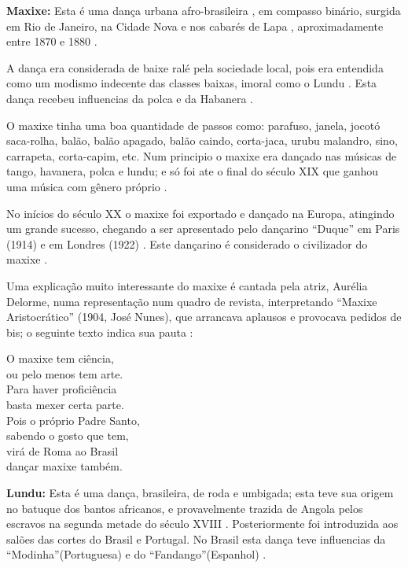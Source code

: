 \begin{remarcar}\textbf{Maxixe:}
Esta é uma dança urbana afro-brasileira \cite[pp. 4]{musicasambavariasdef1}, 
em compasso binário, surgida em Rio de Janeiro, 
na Cidade Nova e nos cabarés de Lapa \cite[pp. 465]{marcondes1977enciclopedia}  \cite[pp. 198]{dourado2004dicionario}, 
aproximadamente entre 1870 e 1880 \cite[pp. 465]{marcondes1977enciclopedia}  \cite[pp. 62]{reinato2010musica}.

A dança era considerada de baixe ralé pela sociedade local, 
pois era entendida como um modismo indecente das classes baixas, imoral como o Lundu \cite[pp. 198]{dourado2004dicionario}.
Esta dança recebeu influencias da polca \cite[pp. 198]{dourado2004dicionario} e da Habanera \cite[pp. 62]{reinato2010musica}.

O maxixe tinha uma boa quantidade de passos como: 
parafuso, 
janela,
jocotó
saca-rolha, 
balão, 
balão apagado,
balão caindo,
corta-jaca,
urubu malandro,
sino, 
carrapeta, 
corta-capim, 
\cite[pp. 465]{marcondes1977enciclopedia} \cite[pp. 68, 129, 131,173]{efege1974maxixe} etc. 
Num principio o maxixe era dançado nas músicas de tango, havanera, polca e lundu; 
e só foi ate o final do século XIX que ganhou uma música com gênero próprio \cite[pp. 465]{marcondes1977enciclopedia}.

No inícios do século XX o maxixe foi exportado e dançado na Europa, atingindo um grande sucesso, 
chegando a ser apresentado pelo dançarino ``Duque'' em Paris (1914) e em Londres (1922) \cite[pp. 465]{marcondes1977enciclopedia}.
Este dançarino é considerado o civilizador do maxixe \cite[pp. 129]{efege1974maxixe}.

Uma explicação muito interessante do maxixe é cantada pela atriz, Aurélia Delorme,
numa representação num quadro de revista, interpretando  ``Maxixe Aristocrático'' (1904, José Nunes), 
que arrancava aplausos e provocava pedidos de bis;
o seguinte texto indica sua pauta \cite[pp. 80-81]{efege1974maxixe} \cite{REIS2003}: 
\begin{citando}
O maxixe tem ciência,\\
ou pelo menos tem arte.\\
Para haver proficiência\\
basta mexer certa parte.\\
Pois o próprio Padre Santo,\\
sabendo o gosto que tem,\\
virá de Roma ao Brasil\\
dançar maxixe também.\\ 
\end{citando}
\end{remarcar}
\begin{remarcar}\textbf{Lundu:} 
Esta é uma dança, brasileira, de roda e umbigada; esta teve sua origem no batuque dos bantos africanos,
e provavelmente trazida de Angola pelos escravos na segunda metade do século XVIII \cite[pp. 198]{dourado2004dicionario}.
Posteriormente foi introduzida aos salões das cortes do Brasil e Portugal.
No Brasil esta dança teve influencias da ``Modinha''(Portuguesa) e do ``Fandango''(Espanhol) \cite[pp. 198]{dourado2004dicionario}.
\end{remarcar}


